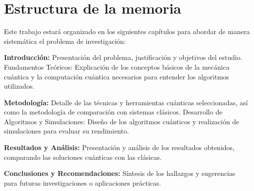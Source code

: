 
\section{Estructura de la memoria}

    Este trabajo estará organizado en los siguientes capítulos para abordar de manera sistemática el problema de investigación:

    \textbf{Introducción:} Presentación del problema, justificación y objetivos del estudio.
    Fundamentos Teóricos: Explicación de los conceptos básicos de la mecánica cuántica y la computación cuántica necesarios para entender los algoritmos utilizados.
    
    \textbf{Metodología:} Detalle de las técnicas y herramientas cuánticas seleccionadas, así como la metodología de comparación con sistemas clásicos.
    Desarrollo de Algoritmos y Simulaciones: Diseño de los algoritmos cuánticos y realización de simulaciones para evaluar su rendimiento.
    
    \textbf{Resultados y Análisis:} Presentación y análisis de los resultados obtenidos, comparando las soluciones cuánticas con las clásicas.
    
   \textbf{ Conclusiones y Recomendaciones:} Síntesis de los hallazgos y sugerencias para futuras investigaciones o aplicaciones prácticas. 

